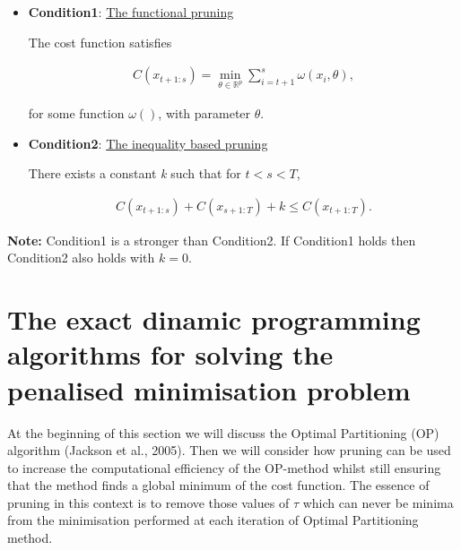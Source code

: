\documentclass[a4paper,12pt]{article}
\begin{document}
		 \begin{itemize}
		 	
		 	\item \textbf{Condition1}: \underline {The functional pruning}
		 	
		 	 The cost function satisfies
		 	 
		 	 \begin{equation}
		 	 	\begin{gathered}
		 	 		C(x_{t+1:s}) = \min_{\theta \in \mathbb{R}^p} \sum_{i=t+1}^{s}\omega(x_i,\theta),
		 	 	\end{gathered}
		 	 	\label{eq:cond1}
		 	 \end{equation}
		 	 
		 	 for some function $\omega()$, with parameter $\theta$.
		 	 
		 	
		 	\item \textbf{Condition2}: \underline {The inequality based pruning}
		 	
		 	There exists a constant \textit{k} such that for $t < s < T$,
		 	
		 	 \begin{equation}
		 		\begin{gathered}
		 			C(x_{t+1:s}) + 	C(x_{s+1:T}) +k \le C(x_{t+1:T}).
		 		\end{gathered}
		 		\label{eq:cond2}
		 	\end{equation}
	 		
		\end{itemize}
	
		\textbf{Note:} Condition1 is a stronger than Condition2. If Condition1 holds then Condition2 also holds with $k = 0$.
		
		 
		
		
	\section{The exact dinamic programming algorithms for solving the penalised minimisation problem}
	\label{section2}
	
	At the beginning of this section we will discuss the Optimal Partitioning (OP) algorithm (Jackson et al., 2005). Then we will consider how pruning can be used to increase the computational efficiency of the OP-method whilst still ensuring that the method finds a global minimum of the cost function. The essence of pruning in this context is to remove those values of $\tau$ which can never be minima from the minimisation performed at each iteration of Optimal Partitioning method. 
	
\end{document}
